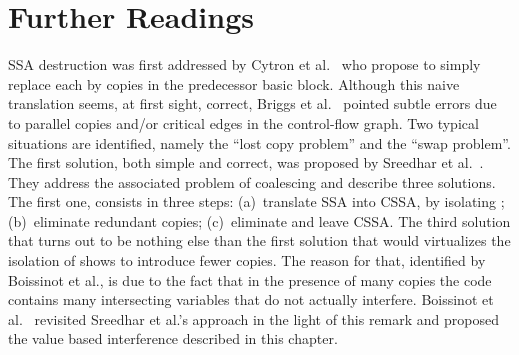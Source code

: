 
\section{Further Readings}
SSA destruction was first addressed by Cytron et al.~\cite{CFR+91} who propose to simply replace each \phifun by copies in the predecessor basic block. 
Although this naive translation seems, at first sight, correct, Briggs et al.~\cite{BriggsSSA} pointed subtle errors due to parallel copies and/or critical edges in the control-flow graph. 
Two typical situations are identified, namely the ``lost copy problem'' and the ``swap problem''. 
The first solution, both simple and correct, was proposed by Sreedhar et al.~\cite{VC+99}. 
They address the associated problem of coalescing and describe three solutions. 
The first one, consists in three steps: 
(a)~translate SSA into CSSA, by isolating \phifuns; 
(b)~eliminate redundant copies; 
(c)~eliminate \phifuns and leave CSSA. 
The third solution that turns out to be nothing else than the first solution that would virtualizes the isolation of \phifuns shows to introduce fewer copies. 
The reason for that, identified by Boissinot et al., is due to the fact that in the presence of many copies the code contains many intersecting variables that do not actually interfere. 
Boissinot et al.~\cite{Boissinot09} revisited Sreedhar et al.'s approach in the light of this remark and proposed the value based interference described in this chapter.

